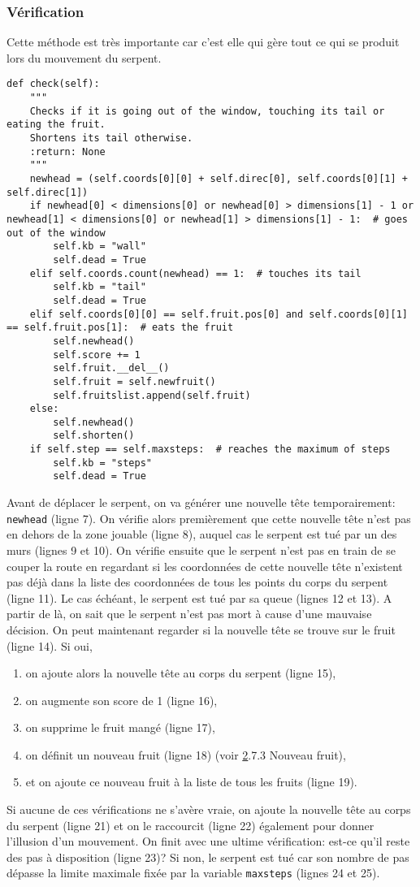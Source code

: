 \documentclass[12pt, a4paper, openany]{book}
\begin{document}
\subsubsection{Vérification}
\label{r:2.7.3-ver}
Cette méthode est très importante car c'est elle qui gère tout ce qui se produit lors du mouvement du serpent.
\begin{verbatim}
def check(self):
    """
    Checks if it is going out of the window, touching its tail or eating the fruit.
    Shortens its tail otherwise.
    :return: None
    """
    newhead = (self.coords[0][0] + self.direc[0], self.coords[0][1] + self.direc[1])
    if newhead[0] < dimensions[0] or newhead[0] > dimensions[1] - 1 or newhead[1] < dimensions[0] or newhead[1] > dimensions[1] - 1:  # goes out of the window
        self.kb = "wall"
        self.dead = True
    elif self.coords.count(newhead) == 1:  # touches its tail
        self.kb = "tail"
        self.dead = True
    elif self.coords[0][0] == self.fruit.pos[0] and self.coords[0][1] == self.fruit.pos[1]:  # eats the fruit
        self.newhead()
        self.score += 1
        self.fruit.__del__()
        self.fruit = self.newfruit()
        self.fruitslist.append(self.fruit)
    else:
        self.newhead()
        self.shorten()
    if self.step == self.maxsteps:  # reaches the maximum of steps
        self.kb = "steps"
        self.dead = True
\end{verbatim}
Avant de déplacer le serpent, on va générer une nouvelle tête temporairement: \verb'newhead' (ligne 7). On vérifie alors premièrement que cette nouvelle tête n'est pas en dehors de la zone jouable (ligne 8), auquel cas le serpent est tué par un des murs (lignes 9 et 10). On vérifie ensuite que le serpent n'est pas en train de se couper la route en regardant si les coordonnées de cette nouvelle tête n'existent pas déjà dans la liste des coordonnées de tous les points du corps du serpent (ligne 11). Le cas échéant, le serpent est tué par sa queue (lignes 12 et 13). A partir de là, on sait que le serpent n'est pas mort à cause d'une mauvaise décision. On peut maintenant regarder si la nouvelle tête se trouve sur le fruit (ligne 14). Si oui,
\begin{enumerate}
	\item on ajoute alors la nouvelle tête au corps du serpent (ligne 15),
	\item on augmente son score de 1 (ligne 16),
	\item on supprime le fruit mangé (ligne 17),
	\item on définit un nouveau fruit (ligne 18) (voir \hyperref[r:2.7.3-fru]2.7.3 Nouveau fruit),
	\item et on ajoute ce nouveau fruit à la liste de tous les fruits (ligne 19).
\end{enumerate}
Si aucune de ces vérifications ne s'avère vraie, on ajoute la nouvelle tête au corps du serpent (ligne 21) et on le raccourcit (ligne 22) également pour donner l'illusion d'un mouvement. On finit avec une ultime vérification: est-ce qu'il reste des pas à disposition (ligne 23)? Si non, le serpent est tué car son nombre de \og{}pas\fg{} dépasse la limite maximale fixée par la variable \verb'maxsteps' (lignes 24 et 25).
\end{document}
